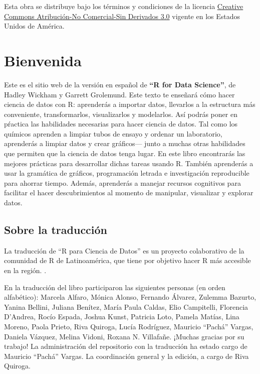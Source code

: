 \documentclass[11pt,oneside]{report}
\begin{document}
Esta obra se distribuye bajo los términos y condiciones de la licencia
\href{http://creativecommons.org/licenses/by-nc-nd/3.0/us/}{Creative
Commons Atribución-No Comercial-Sin Derivados 3.0} vigente en los
Estados Unidos de América.

\newpage
\tableofcontents
\newpage

\setcounter{page}{1}

\chapter*{Bienvenida}

Este es el sitio web de la versión en español de \textbf{``R for Data
Science''}, de Hadley Wickham y Garrett Grolemund. Este texto te
enseñará cómo hacer ciencia de datos con R: aprenderás a importar datos,
llevarlos a la estructura más conveniente, transformarlos, visualizarlos
y modelarlos. Así podrás poner en pŕactica las habilidades necesarias
para hacer ciencia de datos. Tal como los químicos aprenden a limpiar
tubos de ensayo y ordenar un laboratorio, aprenderás a limpiar datos y
crear gráficos--- junto a muchas otras habilidades que permiten que la
ciencia de datos tenga lugar. En este libro encontrarás las mejores
prácticas para desarrollar dichas tareas usando R. También aprenderás a
usar la gramática de gráficos, programación letrada e investigación
reproducible para ahorrar tiempo. Además, aprenderás a manejar recursos
cognitivos para facilitar el hacer descubrimientos al momento de
manipular, visualizar y explorar datos.

\section*{Sobre la traducción}

La traducción de ``R para Ciencia de Datos'' es un proyecto colaborativo
de la comunidad de R de Latinoamérica, que tiene por objetivo hacer R
más accesible en la región. .

En la traducción del libro participaron las siguientes personas (en
orden alfabético): Marcela Alfaro, Mónica Alonso, Fernando Álvarez,
Zulemma Bazurto, Yanina Bellini, Juliana Benítez, María Paula Caldas,
Elio Campitelli, Florencia D'Andrea, Rocío Espada, Joshua Kunst,
Patricia Loto, Pamela Matías, Lina Moreno, Paola Prieto, Riva Quiroga,
Lucía Rodríguez, Mauricio ``Pachá'' Vargas, Daniela Vázquez, Melina
Vidoni, Roxana N. Villafañe. ¡Muchas gracias por su trabajo! La
administración del repositorio con la traducción ha estado cargo de
Mauricio ``Pachá'' Vargas. La coordinación general y la edición, a cargo
de Riva Quiroga.
\end{document}
